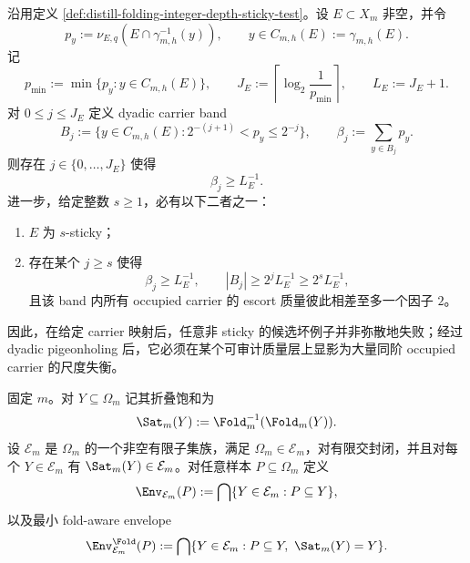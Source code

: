 \begin{theorem}\label{distill:wang_zahl-sticky_reduction_and_scale_saturated_closure-dyadic-sticky-or-scale-imbalance}
沿用定义 \ref{def:distill-folding-integer-depth-sticky-test}。设 \(E\subset X_m\) 非空，并令
\[
p_y:=\nu_{E,q}(E\cap\gamma_{m,h}^{-1}(y)),
\qquad y\in C_{m,h}(E):=\gamma_{m,h}(E).
\]
记
\[
p_{\min}:=\min\{p_y:y\in C_{m,h}(E)\},
\qquad
J_E:=\left\lceil \log_2\frac1{p_{\min}}\right\rceil,
\qquad
L_E:=J_E+1.
\]
对 \(0\le j\le J_E\) 定义 dyadic carrier band
\[
B_j:=\{y\in C_{m,h}(E):2^{-(j+1)}<p_y\le 2^{-j}\},
\qquad
\beta_j:=\sum_{y\in B_j}p_y.
\]
则存在 \(j\in\{0,\ldots,J_E\}\) 使得
\[
\beta_j\ge L_E^{-1}.
\]
进一步，给定整数 \(s\ge1\)，必有以下二者之一：
\begin{enumerate}
  \item \(E\) 为 \(s\)-sticky；
  \item 存在某个 \(j\ge s\) 使得
  \[
  \beta_j\ge L_E^{-1},
  \qquad
  |B_j|\ge 2^jL_E^{-1}\ge 2^sL_E^{-1},
  \]
  且该 band 内所有 occupied carrier 的 escort 质量彼此相差至多一个因子 \(2\)。
\end{enumerate}
因此，在给定 carrier 映射后，任意非 sticky 的候选坏例子并非弥散地失败；经过 dyadic pigeonholing 后，它必须在某个可审计质量层上显影为大量同阶 occupied carrier 的尺度失衡。
\end{theorem}
\begin{definition}\label{def:distill-folding-fold-aware-envelope}
固定 \(m\)。对 \(Y\subseteq\Omega_m\) 记其折叠饱和为
\[
\Sat_m(Y):=\Fold_m^{-1}(\Fold_m(Y)).
\]
设 \(\mathcal E_m\) 是 \(\Omega_m\) 的一个非空有限子集族，满足
\(\Omega_m\in\mathcal E_m\)，对有限交封闭，并且对每个 \(Y\in\mathcal E_m\) 有
\(\Sat_m(Y)\in\mathcal E_m\)。对任意样本 \(P\subseteq\Omega_m\) 定义
\[
\Env_{\mathcal E_m}(P):=\bigcap\{Y\in\mathcal E_m:P\subseteq Y\},
\]
以及最小 fold-aware envelope
\[
\Env^{\Fold}_{\mathcal E_m}(P)
:=\bigcap\{Y\in\mathcal E_m:P\subseteq Y,\ \Sat_m(Y)=Y\}.
\]
\end{definition}

